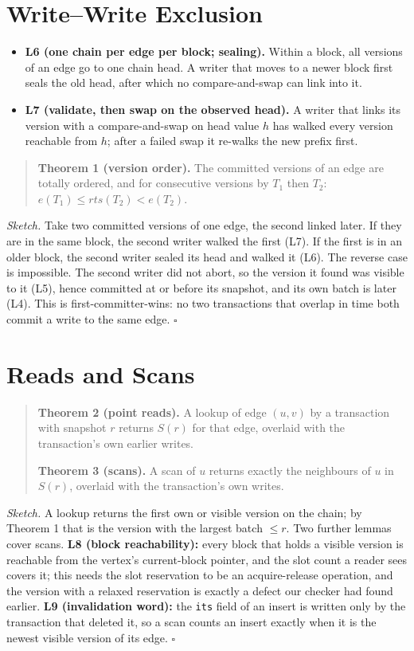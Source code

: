 \documentclass[11pt,a4paper,oneside]{report}
\newcommand{\code}[1]{\texttt{#1}}
\begin{document}
\section{Write--Write Exclusion}
\begin{itemize}
\item \textbf{L6 (one chain per edge per block; sealing).} Within a block, all versions of an edge go to one chain head.
  A writer that moves to a newer block first seals the old head, after which no compare-and-swap can link into it.
\item \textbf{L7 (validate, then swap on the observed head).} A writer that links its version with a compare-and-swap
  on head value $h$ has walked every version reachable from $h$; after a failed swap it re-walks the new prefix first.
\end{itemize}

\begin{quote}
\textbf{Theorem 1 (version order).} The committed versions of an edge are totally ordered, and for consecutive
versions by $T_1$ then $T_2$: $e(T_1) \le rts(T_2) < e(T_2)$.
\end{quote}
\emph{Sketch.} Take two committed versions of one edge, the second linked later. If they are in the same block, the
second writer walked the first (L7). If the first is in an older block, the second writer sealed its head and walked
it (L6). The reverse case is impossible. The second writer did not abort, so the version it found was visible to it
(L5), hence committed at or before its snapshot, and its own batch is later (L4). This is first-committer-wins: no two
transactions that overlap in time both commit a write to the same edge. \hfill$\square$

\section{Reads and Scans}
\begin{quote}
\textbf{Theorem 2 (point reads).} A lookup of edge $(u,v)$ by a transaction with snapshot $r$ returns $S(r)$ for that
edge, overlaid with the transaction's own earlier writes.

\textbf{Theorem 3 (scans).} A scan of $u$ returns exactly the neighbours of $u$ in $S(r)$, overlaid with the
transaction's own writes.
\end{quote}
\emph{Sketch.} A lookup returns the first own or visible version on the chain; by Theorem 1 that is the version with
the largest batch $\le r$. Two further lemmas cover scans. \textbf{L8 (block reachability):} every block that holds a
visible version is reachable from the vertex's current-block pointer, and the slot count a reader sees covers it; this
needs the slot reservation to be an acquire-release operation, and the version with a relaxed reservation is exactly a
defect our checker had found earlier. \textbf{L9 (invalidation word):} the \code{its} field of an insert is written
only by the transaction that deleted it, so a scan counts an insert exactly when it is the newest visible version of
its edge. \hfill$\square$
\end{document}
